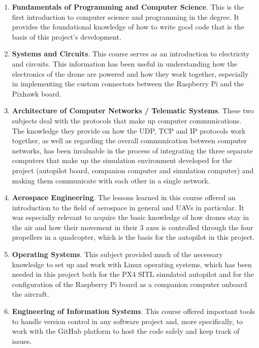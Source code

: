 \begin{enumerate}
    \item \textbf{Fundamentals of Programming and Computer Science}. This is the first introduction to computer science and programming in the degree. It provides the foundational knowledge of how to write good code that is the basis of this project's development.
    
    \item \textbf{Systems and Circuits}. This course serves as an introduction to electricity and circuits. This information has been useful in understanding how the electronics of the drone are powered and how they work together, especially in implementing the custom connectors between the Raspberry Pi and the Pixhawk board.
    
    \item \textbf{Architecture of Computer Networks / Telematic Systems}. These two subjects deal with the protocols that make up computer communications. The knowledge they provide on how the UDP, TCP and IP protocols work together, as well as regarding the overall communication between computer networks, has been invaluable in the process of integrating the three separate computers that make up the simulation environment developed for the project (autopilot board, companion computer and simulation computer) and making them communicate with each other in a single network.
    
    \item \textbf{Aerospace Engineering}. The lessons learned in this course offered an introduction to the field of aerospace in general and UAVs in particular. It was especially relevant to acquire the basic knowledge of how drones stay in the air and how their movement in their 3 axes is controlled through the four propellers in a quadcopter, which is the basis for the autopilot in this project.
    
    \item \textbf{Operating Systems}. This subject provided much of the necessary knowledge to set up and work with Linux operating systems, which has been needed in this project both for the PX4 SITL simulated autopilot and for the configuration of the Raspberry Pi board as a companion computer onboard the aircraft.
    
    \item \textbf{Engineering of Information Systems}. This course offered important tools to handle version control in any software project and, more specifically, to work with the GitHub platform to host the code safely and keep track of issues.
    

\end{enumerate}
